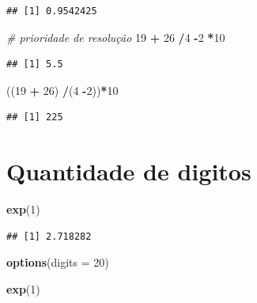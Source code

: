 \documentclass[
]{book}
\newenvironment{Shaded}{\begin{snugshade}}{\end{snugshade}}
\newcommand{\AttributeTok}[1]{\textcolor[rgb]{0.13,0.29,0.53}{#1}}
\newcommand{\CommentTok}[1]{\textcolor[rgb]{0.56,0.35,0.01}{\textit{#1}}}
\newcommand{\DecValTok}[1]{\textcolor[rgb]{0.00,0.00,0.81}{#1}}
\newcommand{\FunctionTok}[1]{\textcolor[rgb]{0.13,0.29,0.53}{\textbf{#1}}}
\newcommand{\NormalTok}[1]{#1}
\newcommand{\SpecialCharTok}[1]{\textcolor[rgb]{0.81,0.36,0.00}{\textbf{#1}}}
\theoremstyle{definition}
\theoremstyle{definition}
\theoremstyle{definition}
\theoremstyle{definition}
\theoremstyle{remark}
\begin{document}
\begin{verbatim}
## [1] 0.9542425
\end{verbatim}

\begin{Shaded}
\begin{Highlighting}[]
\CommentTok{\# prioridade de resolução}
\DecValTok{19} \SpecialCharTok{+} \DecValTok{26} \SpecialCharTok{/}\DecValTok{4} \SpecialCharTok{{-}}\DecValTok{2} \SpecialCharTok{*}\DecValTok{10}
\end{Highlighting}
\end{Shaded}

\begin{verbatim}
## [1] 5.5
\end{verbatim}

\begin{Shaded}
\begin{Highlighting}[]
\NormalTok{((}\DecValTok{19} \SpecialCharTok{+} \DecValTok{26}\NormalTok{) }\SpecialCharTok{/}\NormalTok{(}\DecValTok{4} \SpecialCharTok{{-}}\DecValTok{2}\NormalTok{))}\SpecialCharTok{*}\DecValTok{10}
\end{Highlighting}
\end{Shaded}

\begin{verbatim}
## [1] 225
\end{verbatim}

\section{Quantidade de digitos}\label{quantidade-de-digitos}

\begin{Shaded}
\begin{Highlighting}[]
\FunctionTok{exp}\NormalTok{(}\DecValTok{1}\NormalTok{)}
\end{Highlighting}
\end{Shaded}

\begin{verbatim}
## [1] 2.718282
\end{verbatim}

\begin{Shaded}
\begin{Highlighting}[]
\FunctionTok{options}\NormalTok{(}\AttributeTok{digits =} \DecValTok{20}\NormalTok{)}

\FunctionTok{exp}\NormalTok{(}\DecValTok{1}\NormalTok{)}
\end{Highlighting}
\end{Shaded}
\end{document}
